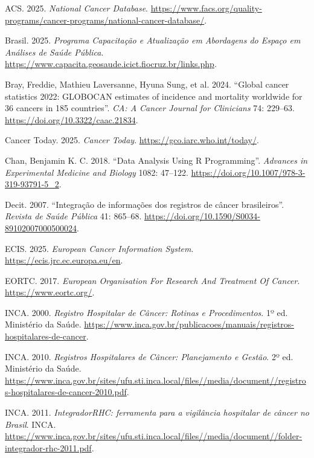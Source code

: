 \documentclass[
  brazilian,
  a4paper,
  oneside]{scrbook}
\newlength{\cslhangindent}
\newenvironment{CSLReferences}[2] %
 {\begin{list}{}{%
  \setlength{\itemindent}{0pt}
  \setlength{\leftmargin}{0pt}
  \setlength{\parsep}{0pt}
  \ifodd #1
   \setlength{\leftmargin}{\cslhangindent}
   \setlength{\itemindent}{-1\cslhangindent}
  \fi
  \setlength{\itemsep}{#2\baselineskip}}}
 {\end{list}}
\begin{document}
\protect{}\label{refs}
\begin{CSLReferences}{1}{1}
ACS. 2025. \emph{National Cancer Database}.
\url{https://www.facs.org/quality-programs/cancer-programs/national-cancer-database/}.

Brasil. 2025. \emph{Programa Capacitação e Atualização em Abordagens do
Espaço em Análises de Saúde Pública}.
\url{https://www.capacita.geosaude.icict.fiocruz.br/links.php}.

{Bray, Freddie, Mathieu Laversanne, Hyuna Sung, et al.} 2024. {``Global
cancer statistics 2022: {GLOBOCAN} estimates of incidence and mortality
worldwide for 36 cancers in 185 countries''}. \emph{CA: A Cancer Journal
for Clinicians} 74: 229--63. \url{https://doi.org/10.3322/caac.21834}.

Cancer Today. 2025. \emph{Cancer Today}.
\url{https://gco.iarc.who.int/today/}.

Chan, Benjamin K. C. 2018. {``Data Analysis Using {R} Programming''}.
\emph{Advances in Experimental Medicine and Biology} 1082: 47--122.
\url{https://doi.org/10.1007/978-3-319-93791-5_2}.

Decit. 2007. {``Integração de informações dos registros de câncer
brasileiros''}. \emph{Revista de Saúde Pública} 41: 865--68.
\url{https://doi.org/10.1590/S0034-89102007000500024}.

ECIS. 2025. \emph{European Cancer Information System}.
\url{https://ecis.jrc.ec.europa.eu/en}.

EORTC. 2017. \emph{European Organisation For Research And Treatment Of
Cancer}. \url{https://www.eortc.org/}.

INCA. 2000. \emph{Registro Hospitalar de Câncer: Rotinas e
Procedimentos}. 1º ed. Ministério da Saúde.
\url{https://www.inca.gov.br/publicacoes/manuais/registros-hospitalares-de-cancer}.

INCA. 2010. \emph{Registros Hospitalares de Câncer: Planejamento e
Gestão}. 2º ed. Ministério da Saúde.
\url{https://www.inca.gov.br/sites/ufu.sti.inca.local/files//media/document//registros-hospitalares-de-cancer-2010.pdf}.

INCA. 2011. \emph{{IntegradorRHC}: ferramenta para a vigilância
hospitalar de câncer no Brasil}. INCA.
\url{https://www.inca.gov.br/sites/ufu.sti.inca.local/files//media/document//folder-integrador-rhc-2011.pdf}.


\end{CSLReferences}
\end{document}
